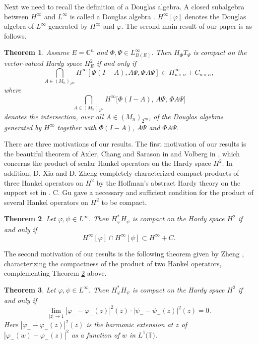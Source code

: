 \documentclass{article}%
\newtheorem{theorem}{Theorem}[section]
\begin{document}
Next we need to recall the definition of a Douglas algebra. A closed
subalgebra between $H^{\infty}$ and $L^{\infty}$ is called a Douglas algebra
\cite{Chang, Marshall}. $H^{\infty}[\varphi]$ denotes the Douglas algebra of
$L^{\infty}$ generated by $H^{\infty}$ and $\varphi$. The second main result
of our paper is as follows.

\begin{theorem}
\label{maina}Assume $E=\mathbb{C}^{n}$ and $\Phi,\Psi\in L_{B(E)}^{\infty}.$
Then $H_{\Phi}T_{\Psi}$ is compact on the vector-valued Hardy space $H_{E}%
^{2}$ if and only if
\[
\bigcap_{A\in\left(  M_{n}\right)  _{2^{2n}}}H^{\infty}\left[  \Phi
(I-A),A\Psi,\Phi A\Psi\right]  \subset H_{n\times n}^{\infty}+C_{n\times n},
\]
where \[
\bigcap_{A \in (M_{n})_{2^{2n}}} 
   H^{\infty}\!\bigl[\Phi(I-A),\, A\Psi,\, \Phi A\Psi\bigr]
\]denotes the intersection, over all $A \in (M_{n})_{2^{2n}}$, 
of the Douglas algebras generated by $H^{\infty}$ together with $\Phi(I-A)$, $A\Psi$ and $\Phi A\Psi$.
\end{theorem}

There are three motivations of our results. The first motivation of our
results is the beautiful theorem of Axler, Chang and Sarason in \cite{ACS} and
Volberg in \cite{Volberg}, which concerns the product of scalar Hankel
operators on the Hardy space $H^{2}.$ In addition, D. Xia and D. Zheng  \cite{ZhengXia1, ZhengXia2}  completely characterized compact products of three Hankel operators on $H^2$ by the Hoffman's abstract Hardy theory on the support set in \cite{Hoffmanacta}. C. Gu \cite{GUIEOT} gave a necessary and sufficient condition for the product of several Hankel operators on $H^2$ to be compact.

\begin{theorem}
\label{ACS,Volberg} \cite{ACS,Volberg}Let $\varphi,\psi\in L^{\infty}.$ Then
$H_{\varphi}^{\ast}H_{\psi}$ is compact on the Hardy space $H^{2}$ if and only
if
\[
H^{\infty}[{\varphi}]\cap H^{\infty}[\psi]\subset H^{\infty}+C.
\]

\end{theorem}

The second motivation of our results is the following theorem given by Zheng
\cite{Zheng}, characterizing the compactness of the product of two Hankel
operators, complementing Theorem \ref{ACS,Volberg} above.

\begin{theorem}
\cite{Zheng} Let $\varphi,\psi\in L^{\infty}.$ Then $H_{\varphi}^{\ast}%
H_{\psi}$ is compact on the Hardy space $H^{2}$ if and only if
\[
\lim_{\left\vert z\right\vert \rightarrow1}\left\vert \varphi_{-}-\varphi
_{-}(z)\right\vert ^{2}(z)\cdot\left\vert \psi_{-}-\psi_{-}(z)\right\vert
^{2}(z)=0.
\]
Here $\left\vert \varphi_{-}-\varphi_{-}(z)\right\vert ^{2}(z)$ is the
harmonic extension at $z$ of $\left\vert \varphi_{-}(w)-\varphi_{-}%
(z)\right\vert ^{2}$ as a function of $w$ in $L^{1}(\mathbb{T)}$.
\end{theorem}
\end{document}

